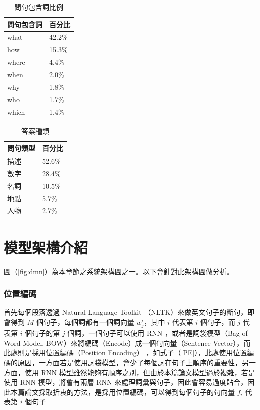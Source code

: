 \begin{table}
    \caption{問句包含詞比例}
    \label{table:query_percentage}
    \centering
    \begin{tabular}[h]{|l|l|}
        \hline
        問句包含詞  &百分比\\
        \hline
        what        &42.2\%\\
        \hline
        how         &15.3\%\\
        \hline
        where       &4.4\%\\
        \hline
        when        &2.0\%\\
        \hline
        why         &1.8\%\\
        \hline
        who         &1.7\%\\
        \hline
        which       &1.4\%\\
        \hline
    \end{tabular}
\end{table}

\begin{table}
    \caption{答案種類}
    \label{table:query_type}
    \centering
    \begin{tabular}{|l|l|}
        \hline
        問句類型            &百分比\\
        \hline
        描述 &52.6\%\\
        \hline
        數字    &28.4\%\\
        \hline
        名詞      &10.5\%\\
        \hline
        地點    &5.7\%\\
        \hline
        人物      &2.7\%\\
        \hline
    \end{tabular}
\end{table}

\section{模型架構介紹}
圖（\ref{fig:dmn}）為本章節之系統架構圖之一。以下會針對此架構圖做分析。

\subsubsection{位置編碼}
首先每個段落透過 Natural Language Toolkit （NLTK）來做英文句子的斷句，即會得到 $M$ 個句子，每個詞都有一個詞向量 $w_j^i$，其中 $i$ 代表第 $i$ 個句子，而 $j$ 代表第 $i$ 個句子的第 $j$ 個詞，一個句子可以使用 RNN ，或者是詞袋模型（Bag of Word Model, BOW）來將編碼（Encode）成一個句向量（Sentence Vector），而此處則是採用位置編碼（Position Encoding）\cite{sukhbaatar2015end}  ，如式子（\ref{PE}），此處使用位置編碼的原因，一方面若是使用詞袋模型，會少了每個詞在句子上順序的重要性，另一方面，使用 RNN 模型雖然能夠有順序之別，但由於本篇論文模型過於複雜，若是使用 RNN 模型，將會有兩層 RNN 來處理詞彙與句子，因此會容易過度貼合，因此本篇論文採取折衷的方法，是採用位置編碼，可以得到每個句子的句向量 $f_i$ 代表第 $i$ 個句子

